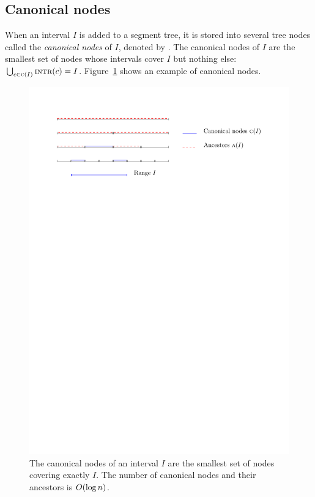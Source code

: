 \documentclass[english,gradu]{tktltiki2018}
\begin{document}
\subsection{Canonical nodes}

When an interval $I$ is added to a segment tree, it is stored into several tree nodes called the \emph{canonical nodes} of $I$, denoted by .
The canonical nodes of $I$ are the smallest set of nodes whose intervals cover $I$ but nothing else: $\bigcup_{c\in\textsc{c}(I)} \textsc{intr}(c)=I$.
Figure~\ref{fig:canon} shows an example of canonical nodes.

\begin{figure}\centering
	\includegraphics[scale=0.75,page=1]{fig/canon}
	\caption{The canonical nodes of an interval $I$ are the smallest set of nodes covering exactly $I$.
	The number of canonical nodes  and their ancestors  is $O(\log n)$.}\label{fig:canon}
\end{figure}
\end{document}
